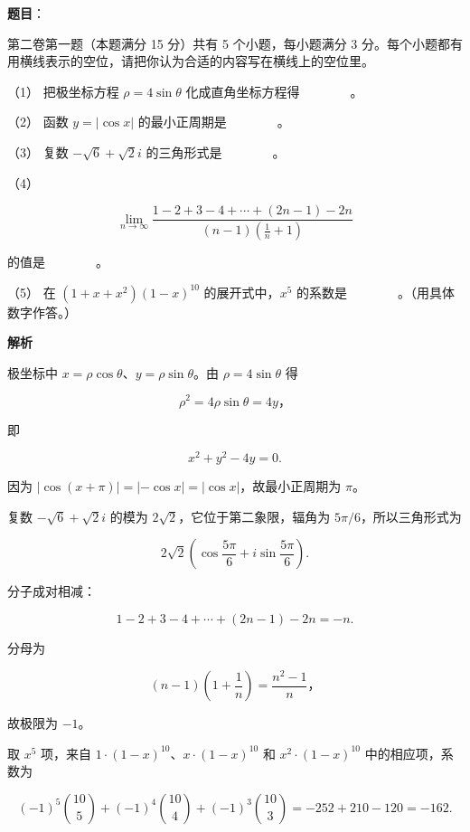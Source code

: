 \begin{answer}

\textbf{题目}：

第二卷第一题（本题满分 15 分）共有 5 个小题，每小题满分 3 分。每个小题都有用横线表示的空位，请把你认为合适的内容写在横线上的空位里。

（1） 把极坐标方程 $\rho=4\sin\theta$ 化成直角坐标方程得　　　　。

（2） 函数 $y=|\cos x|$ 的最小正周期是　　　　。

（3） 复数 $-\sqrt6+\sqrt2i$ 的三角形式是　　　　。

（4）　

\nopagebreak[4]
\[
\lim_{n\to\infty}
\frac{1-2+3-4+\cdots+(2n-1)-2n}{(n-1)\left(\frac1n+1\right)}
\]

的值是　　　　。

（5） 在 $(1+x+x^2)(1-x)^{10}$ 的展开式中，$x^5$ 的系数是　　　　。（用具体数字作答。）

\textbf{解析}


极坐标中 $x=\rho\cos\theta$、$y=\rho\sin\theta$。由 $\rho=4\sin\theta$ 得

\nopagebreak[4]
\[
\rho^2=4\rho\sin\theta=4y\text{，}
\]

即

\nopagebreak[4]
\[
x^2+y^2-4y=0.
\]


因为 $|\cos(x+\pi)|=|{-\cos x}|=|\cos x|$，故最小正周期为 $\pi$。


复数 $-\sqrt6+\sqrt2i$ 的模为 $2\sqrt2$，它位于第二象限，辐角为 $5\pi/6$，所以三角形式为

\nopagebreak[4]
\[
2\sqrt2\left(\cos\frac{5\pi}{6}+i\sin\frac{5\pi}{6}\right).
\]


分子成对相减：

\nopagebreak[4]
\[
1-2+3-4+\cdots+(2n-1)-2n=-n.
\]

分母为

\nopagebreak[4]
\[
(n-1)\left(1+\frac1n\right)=\frac{n^2-1}{n}\text{，}
\]

故极限为 $-1$。


取 $x^5$ 项，来自 $1\cdot(1-x)^{10}$、$x\cdot(1-x)^{10}$ 和 $x^2\cdot(1-x)^{10}$ 中的相应项，系数为

\nopagebreak[4]
\[
(-1)^5\binom{10}{5}+(-1)^4\binom{10}{4}+(-1)^3\binom{10}{3}
=-252+210-120=-162.
\]






\end{answer}
